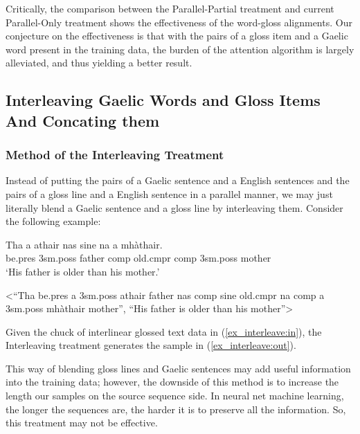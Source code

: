 \documentclass[11pt,a4paper]{article}
\begin{document}
Critically, the comparison between the Parallel-Partial treatment and current Parallel-Only treatment shows the effectiveness of the word-gloss alignments. Our conjecture on the effectiveness is that with the pairs of a gloss item and a Gaelic word present in the training data, the burden of the attention algorithm \citep{bahdanau2014neural} is largely alleviated, and thus yielding a better result. 

\subsection{Interleaving Gaelic Words and Gloss Items And Concating them}\label{treatment:InterleavingAndConCat}
\subsubsection{Method of the Interleaving Treatment}
Instead of putting the pairs of a Gaelic sentence and a English sentences and the pairs of a gloss line and a English sentence in a parallel manner, we may just literally blend a Gaelic sentence and a gloss line by interleaving them. Consider the following example:

\begin{exe} 
\ex 
	\begin{xlist}
	\ex \label{ex_interleave:in}
		\gll	 Tha a athair nas sine na a mh\`athair.\\  
     		     be.pres 3sm.poss father comp old.cmpr comp 3sm.poss mother \\
    	\glt    `His father is older than his mother.'  

    \ex \label{ex_interleave:out} <``Tha be.pres a 3sm.poss athair father nas comp sine old.cmpr na comp a 3sm.poss mh\`athair mother'', ``His father is older than his mother''>
    \end{xlist}
\end{exe}

Given the chuck of interlinear glossed text data in (\ref{ex_interleave:in}), the Interleaving treatment generates the sample in (\ref{ex_interleave:out}).  

This way of blending gloss lines and Gaelic sentences may add useful information into the training data; however, the downside of this method is to increase the length our samples on the source sequence side. In neural net machine learning, the longer the sequences are, the harder it is to preserve all the information. So, this treatment may not be effective. 
\end{document}
